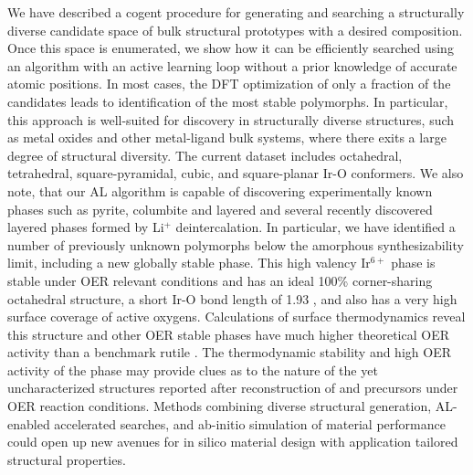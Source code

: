 


%
We have described a cogent procedure for generating and searching a structurally diverse candidate space of bulk structural prototypes with a desired composition.
%
Once this space is enumerated, we show how it can be efficiently searched using an algorithm with an active learning loop without a prior knowledge of accurate atomic positions.
%
In most cases, the DFT optimization of only a fraction of the candidates leads to identification of the most stable polymorphs.
%
In particular, this approach is well-suited for discovery in structurally diverse structures, such as metal oxides and other metal-ligand bulk systems, where there exits a large degree of structural diversity.
%
The current dataset includes octahedral, tetrahedral, square-pyramidal, cubic, and square-planar Ir-O conformers.
%
We also note, that our AL algorithm is capable of discovering experimentally known phases such as pyrite, columbite and layered \IrOtwo and several recently discovered layered \IrOthree phases formed by Li$^+$ deintercalation.
%
In particular, we have identified a number of previously unknown \IrOthree polymorphs below the amorphous synthesizability limit,
including a new globally stable \aIrOthree phase.
%
This high valency Ir$^{6+}$ phase is stable under OER relevant conditions and has an ideal 100\% corner-sharing octahedral structure, a short Ir-O bond length of 1.93 \angstrom, and also has a very high surface coverage of active oxygens.
%
Calculations of surface thermodynamics reveal this structure and other OER stable \IrOthree phases have much higher theoretical OER activity than a benchmark rutile \IrOtwo.
%
The thermodynamic stability and high OER activity of the \aIrOthree phase may provide clues as to the nature of the yet uncharacterized structures reported after reconstruction of  and \IrOx precursors under OER reaction conditions.
%
Methods combining diverse structural generation, AL-enabled accelerated searches, and \mbox{ab-initio} simulation of material performance could open up new avenues for in silico material design with application tailored structural properties.







